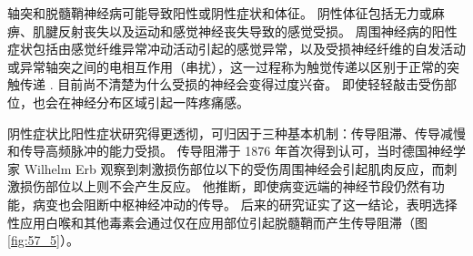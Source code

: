轴突和脱髓鞘神经病可能导致阳性或阴性症状和体征。 阴性体征包括无力或麻痹、肌腱反射丧失以及运动和感觉神经丧失导致的感觉受损。 周围神经病的阳性症状包括由感觉纤维异常冲动活动引起的感觉异常，以及受损神经纤维的自发活动或异常轴突之间的电相互作用（串扰），这一过程称为触觉传递以区别于正常的突触传递 . 目前尚不清楚为什么受损的神经会变得过度兴奋。 即使轻轻敲击受伤部位，也会在神经分布区域引起一阵疼痛感。

阴性症状比阳性症状研究得更透彻，可归因于三种基本机制：传导阻滞、传导减慢和传导高频脉冲的能力受损。 传导阻滞于 1876 年首次得到认可，当时德国神经学家 Wilhelm Erb 观察到刺激损伤部位以下的受伤周围神经会引起肌肉反应，而刺激损伤部位以上则不会产生反应。 他推断，即使病变远端的神经节段仍然有功能，病变也会阻断中枢神经冲动的传导。 后来的研究证实了这一结论，表明选择性应用白喉和其他毒素会通过仅在应用部位引起脱髓鞘而产生传导阻滞（图 \ref{fig:57_5}）。


